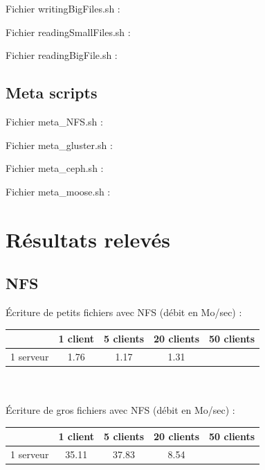 \documentclass[12pt]{report}
\begin{document}
				Fichier writingBigFiles.sh :
				

				Fichier readingSmallFiles.sh :
				

				Fichier readingBigFile.sh :
				
			\section{Meta scripts}
				Fichier meta\_NFS.sh :
				

				Fichier meta\_gluster.sh :
				

				Fichier meta\_ceph.sh :
				

				Fichier meta\_moose.sh :
				

		\chapter{Résultats relevés}

			\section{NFS}

			Écriture de petits fichiers avec NFS (débit en Mo/sec) :

			\begin{tabular}{|l|c|c|c|c|}
				\hline
				& 1 client & 5 clients & 20 clients & 50 clients \\
				\hline
				1 serveur & 1.76 & 1.17 & 1.31 & \\
				\hline
			\end{tabular}\\\\

			Écriture de gros fichiers avec NFS (débit en Mo/sec) :

			\begin{tabular}{|l|c|c|c|c|}
				\hline
				& 1 client & 5 clients & 20 clients & 50 clients \\
				\hline
				1 serveur & 35.11 & 37.83 & 8.54 & \\
				\hline
			\end{tabular}\\\\
\end{document}
